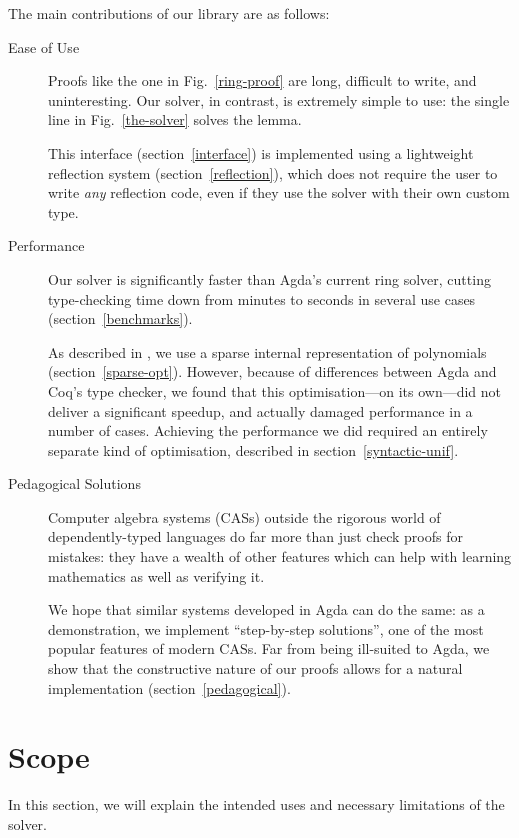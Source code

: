 \documentclass[12pt]{article}
\begin{document}
The main contributions of our library are as follows:
\begin{description}
  \item[Ease of Use] Proofs like the one in Fig.~\ref{ring-proof} are long,
    difficult to write, and uninteresting. Our solver, in contrast, is extremely
    simple to use: the single line in Fig.~\ref{the-solver} solves the lemma.

    This interface (section~\ref{interface}) is implemented using a lightweight
    reflection system (section~\ref{reflection}), which does not require the user
    to write \emph{any} reflection code, even if they use the solver with their
    own custom type. 
  \item[Performance] Our solver is significantly faster than Agda's current ring
    solver, cutting type-checking time down from minutes to seconds in several
    use cases (section~\ref{benchmarks}).

    As described in \cite{gregoire_proving_2005}, we use a sparse internal
    representation of polynomials (section~\ref{sparse-opt}). However, because
    of differences between Agda and Coq's type checker, we found that this
    optimisation---on its own---did not deliver a significant speedup, and
    actually damaged performance in a number of cases. Achieving the performance
    we did required an entirely separate kind of optimisation, described in
    section~\ref{syntactic-unif}.
  \item[Pedagogical Solutions] Computer algebra systems (CASs) outside the
    rigorous world of dependently-typed languages do far more than just check
    proofs for mistakes: they have a wealth of other features which can help
    with learning mathematics as well as verifying it.

    We hope that similar systems developed in Agda can do the same: as a
    demonstration, we implement ``step-by-step solutions'', one of the most
    popular features of modern CASs. Far from being ill-suited to Agda, we show
    that the constructive nature of our proofs allows for a natural
    implementation (section~\ref{pedagogical}).
\end{description}
\section{Scope}
In this section, we will explain the intended uses and necessary limitations of
the solver.
\end{document}
